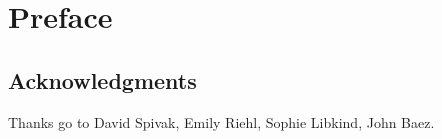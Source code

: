 \documentclass[DynamicalBook]{subfiles}
\begin{document}
%


\setcounter{chapter}{0}%


\chapter{Preface}\label{chapter.0}



\section*{Acknowledgments}

Thanks go to David Spivak, Emily Riehl, Sophie Libkind, John Baez.
\end{document}
